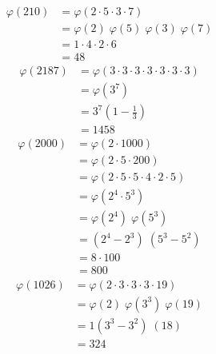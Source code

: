 \documentclass[12pt,class=book,crop=false]{standalone}
\begin{document}
\begin{soln}
    \begin{align*}
        \varphi(210) & =\varphi(2\cdot 5\cdot3\cdot7)                   \\
                     & =\varphi(2)\;\varphi( 5)\;\varphi(3)\;\varphi(7) \\
                     & =1\cdot4\cdot2\cdot6                             \\
                     & =48
    \end{align*}
    \begin{align*}
        \varphi(2187) & =\varphi(3\cdot 3\cdot 3\cdot 3\cdot 3\cdot 3\cdot 3) \\
                      & =\varphi\left(3^7\right)                              \\
                      & =3^7\left( 1-\frac{1}{3} \right)                      \\
                      & =1458
    \end{align*}
    \begin{align*}
        \varphi(2000) & =\varphi(2\cdot 1000)                                \\
                      & =\varphi\left(2\cdot5\cdot200\right)                 \\
                      & =\varphi\left(2\cdot5\cdot5\cdot4\cdot2\cdot5\right) \\
                      & =\varphi\left( 2^4\cdot5^3\right)                    \\
                      & =\varphi\left( 2^4\right)\;\varphi\left(5^3\right)   \\
                      & =\left( 2^4-2^3\right)\;\left(5^3-5^2\right)         \\
                      & =8\cdot100                                           \\
                      & =800
    \end{align*}
    \begin{align*}
        \varphi(1026) & =\varphi(2\cdot 3\cdot3\cdot3\cdot19)                         \\
                      & =\varphi\left( 2\right)\;\varphi\left(3^3\right)\;\varphi(19) \\
                      & =1\left( 3^3-3^2\right)\;\left(18\right)                      \\
                      & =324
    \end{align*}
    \begin{align*}

\end{align*}
\end{soln}
\end{document}
